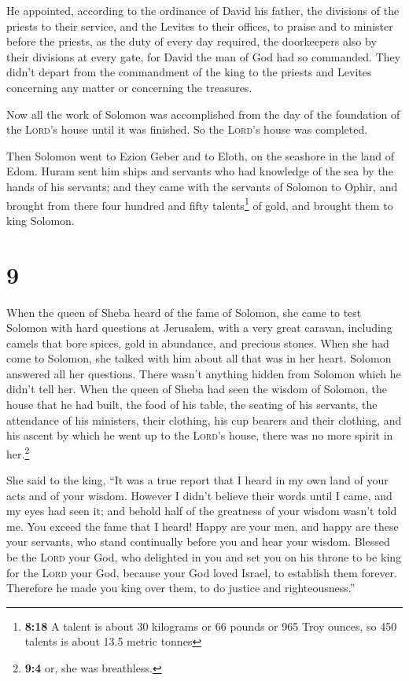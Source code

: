  He appointed, according to the ordinance of David his
father, the divisions of the priests to their service, and the Levites
to their offices, to praise and to minister before the priests, as the
duty of every day required, the doorkeepers also by their divisions at
every gate, for David the man of God had so commanded. 
They didn't depart from the commandment of the king to the priests and
Levites concerning any matter or concerning the treasures.

 Now all the work of Solomon was accomplished from the
day of the foundation of the \textsc{Lord}'s house until it was
finished. So the \textsc{Lord}'s house was completed.

 Then Solomon went to Ezion Geber and to Eloth, on the
seashore in the land of Edom.  Huram sent him ships and
servants who had knowledge of the sea by the hands of his servants; and
they came with the servants of Solomon to Ophir, and brought from there
four hundred and fifty talents\footnote{\textbf{8:18} A talent is about
  30 kilograms or 66 pounds or 965 Troy ounces, so 450 talents is about
  13.5 metric tonnes} of gold, and brought them to king Solomon.

\hypertarget{section-8}{%
\section{9}\label{section-8}}

 When the queen of Sheba heard of the fame of Solomon, she
came to test Solomon with hard questions at Jerusalem, with a very great
caravan, including camels that bore spices, gold in abundance, and
precious stones. When she had come to Solomon, she talked with him about
all that was in her heart.  Solomon answered all her
questions. There wasn't anything hidden from Solomon which he didn't
tell her.  When the queen of Sheba had seen the wisdom of
Solomon, the house that he had built,  the food of his
table, the seating of his servants, the attendance of his ministers,
their clothing, his cup bearers and their clothing, and his ascent by
which he went up to the \textsc{Lord}'s house, there was no more spirit
in her.\footnote{\textbf{9:4} or, she was breathless.}

 She said to the king, ``It was a true report that I heard
in my own land of your acts and of your wisdom.  However I
didn't believe their words until I came, and my eyes had seen it; and
behold half of the greatness of your wisdom wasn't told me. You exceed
the fame that I heard!  Happy are your men, and happy are
these your servants, who stand continually before you and hear your
wisdom.  Blessed be the \textsc{Lord} your God, who
delighted in you and set you on his throne to be king for the
\textsc{Lord} your God, because your God loved Israel, to establish them
forever. Therefore he made you king over them, to do justice and
righteousness.''

